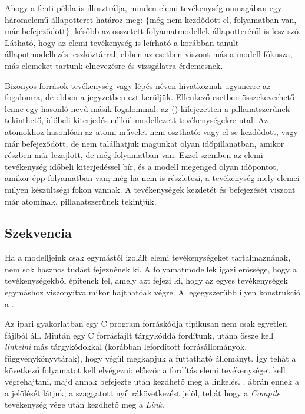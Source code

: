 
Ahogy a fenti példa is illusztrálja, minden elemi tevékenység önmagában egy háromelemű állapotteret határoz meg: $\{$még nem kezdődött el, folyamatban van, már befejeződött$\}$; később az összetett folyamatmodellek állapotteréről is lesz szó. Látható, hogy az elemi tevékenység is leírható a korábban tanult állapotmodellezési eszköztárral; ebben az esetben viszont más a modell fókusza, más elemeket tartunk elnevezésre és vizsgálatra érdemesnek.

\begin{megjegyzes}
	Bizonyos források  tevékenység vagy lépés néven hivatkoznak ugyanerre az  fogalomra, de ebben a jegyzetben ezt kerüljük. Ellenkező esetben összekeverhető lenne  egy hasonló nevű másik fogalommal: az  () kifejezetten a pillanatszerűnek tekinthető, időbeli kiterjedés nélkül modellezett tevékenységekre utal. Az atomokhoz hasonlóan az atomi művelet nem osztható: vagy el se kezdődött, vagy már befejeződött, de nem találhatjuk magunkat olyan időpillanatban, amikor részben már lezajlott, de még folyamatban van. Ezzel szemben az elemi tevékenység időbeli kiterjedéssel bír, és a modell megenged olyan időpontot, amikor épp folyamatban van; még ha nem is részletezi, a tevékenység mely elemei milyen készültségi fokon vannak. A tevékenységek kezdetét és befejezését viszont már atominak, pillanatszerűnek tekintjük.
\end{megjegyzes}

\subsection{Szekvencia}
Ha a modelljeink csak egymástól izolált elemi tevékenységeket tartalmaznának, nem sok hasznos tudást fejeznének ki. A folyamatmodellek igazi erőssége, hogy a tevékenységekből  építenek fel, amely azt fejezi ki, hogy az egyes tevékenységek egymáshoz viszonyítva mikor hajthatóak végre. A legegyszerűbb ilyen konstrukció a .

\begin{pelda}
Az ipari gyakorlatban egy C program forráskódja tipikusan nem csak egyetlen fájlból áll. Miután egy C forrásfájlt tárgykóddá fordítunk, utána össze kell \emph{linkelni} más tárgykódokkal (korábban lefordított forrásállományok, függvénykönyvtárak), hogy végül megkapjuk a futtatható állományt. Így tehát a következő folyamatot kell elvégezni: először a fordítás elemi tevékenységet kell végrehajtani, majd annak befejezte után kezdhető meg a linkelés. . ábrán ennek a  a jelölését látjuk; a szaggatott nyíl rákövetkezést jelöl, tehát hogy a \emph{Compile} tevékenység vége után kezdhető meg a \emph{Link}.
\end{pelda}

